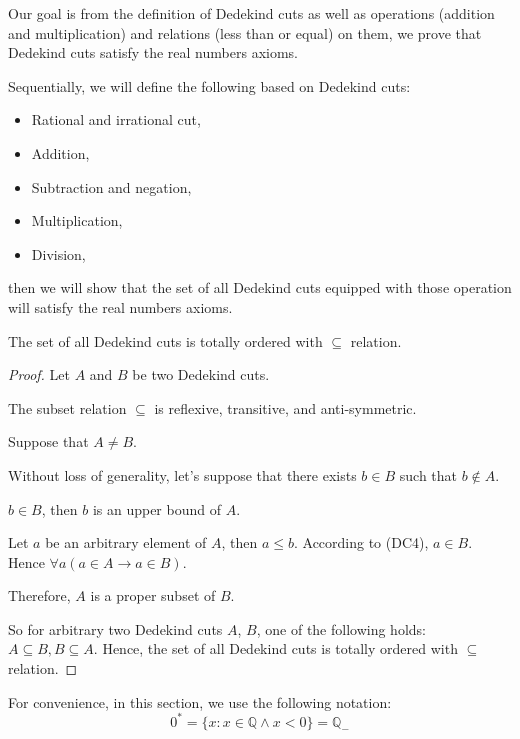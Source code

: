 \par Our goal is from the definition of Dedekind cuts as well as operations (addition and multiplication) and relations (less than or equal) on them, we prove that Dedekind cuts satisfy the real numbers axioms.

\par Sequentially, we will define the following based on Dedekind cuts:
\begin{itemize}
    \item Rational and irrational cut,
    \item Addition,
    \item Subtraction and negation,
    \item Multiplication,
    \item Division,
\end{itemize}
\par then we will show that the set of all Dedekind cuts equipped with those operation will satisfy the real numbers axioms.

\begin{theorem}
    The set of all Dedekind cuts is totally ordered with $\subseteq$ relation.
\end{theorem}

\begin{proof}
    \par Let $A$ and $B$ be two Dedekind cuts.
    \par The subset relation $\subseteq$ is reflexive, transitive, and anti-symmetric.
    \bigskip
    \par Suppose that $A\ne B$.
    \par Without loss of generality, let's suppose that there exists $b\in B$ such that $b\notin A$.
    \par $b\in B$, then $b$ is an upper bound of $A$.
    \par Let $a$ be an arbitrary element of $A$, then $a\le b$. According to (DC4), $a\in B$. Hence $\forall a(a\in A\rightarrow a\in B)$.
    \par Therefore, $A$ is a proper subset of $B$.
    \bigskip
    \par So for arbitrary two Dedekind cuts $A$, $B$, one of the following holds: $A\subseteq B, B\subseteq A$. Hence, the set of all Dedekind cuts is totally ordered with $\subseteq$ relation.
\end{proof}

\par For convenience, in this section, we use the following notation:
\[
    {0}^{*} = \{ x : x\in\mathbb{Q} \wedge x < 0 \} = {\mathbb{Q}}_{-}
\]

